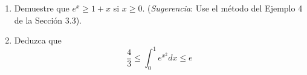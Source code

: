 \item 
\begin{enumerate}
    \item[(a)] Demuestre que $e^x \ge 1 + x$ si $x \ge 0$. (\textit{Sugerencia}: Use el método del Ejemplo 4 de la Sección 3.3).
    \item[(b)] Deduzca que
    $$\frac{4}{3} \le \int_0^1 e^{x^2} dx \le e$$
\end{enumerate}
